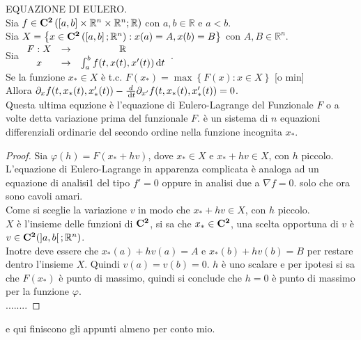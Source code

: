 \theorem EQUAZIONE DI EULERO.\\
Sia $f\in \mathbf{C^{2}}\left(\left[a,b\right]\times\mathbb{R}^n\times\mathbb{R}^n;\mathbb{R}\right)$ con $a,b\in\mathbb{R}$ e $a<b$.\\
Sia $X=\left\{x\in \mathbf{C^{2}}\left(\left[a,b\right];\mathbb{R}^n\right): x(a)=A, x(b)=B\right\}$ con $A,B\in\mathbb{R}^n$.\\
Sia $\begin{array}{ccc} F: X & \to & \mathbb{R} \\
x & \to & \int_{a}^b f(t,x(t), x'(t))\,\mathrm{d}{t}\end{array}$.\\
Se la funzione $x_\ast\in X$ è t.c. $F(x_\ast)=\max\left\{F(x):x\in X \right\}$ [o min]\\
Allora $\partial_xf(t,x_\ast(t), x_\ast'(t))-\frac{d}{\,\mathrm{d}{t}}\partial_{ x'}f(t,x_\ast(t), x_\ast'(t))=0$.\\
Questa ultima equzione è l'equazione di Eulero-Lagrange del Funzionale $F$ o a volte detta variazione prima del funzionale $F$. è un sistema di $n$ equazioni differenziali ordinarie del secondo ordine nella funzione incognita $x_\ast$.
\begin{proof}
	 Sia $\varphi(h)=F(x_\ast+hv)$, dove $x_\ast\in X$ e $x_\ast+hv\in X$, con $h$ piccolo.\\
	 L'equazione di Eulero-Lagrange in apparenza complicata è analoga ad un equazione di analisi1 del tipo $f'=0$ oppure in analisi due a $\nabla f=0$. solo che ora sono cavoli amari.\\
	 Come si sceglie la variazione $v$ in modo che $x_\ast+hv\in X$, con $h$ piccolo.\\
	 $X$ è l'insieme delle funzioni di $\mathbf{C^{2}}$, si sa che $x_\ast\in \mathbf{C^{2}}$, una scelta opportuna di $v$ è $v\in \mathbf{C^{2}}(\left]a,b\right[;\mathbb{R}^n)$.\\
	 Inotre deve essere che $ x_\ast(a)+hv(a)=A$ e  $x_\ast(b)+hv(b)=B$ per restare dentro l'insieme $X$.
	 Quindi $v(a)=v(b)=0$.
	 $h$ è uno scalare e per ipotesi si sa che $F(x_\ast)$ è punto di massimo, quindi si conclude che $h=0$ è punto di massimo per la funzione $\varphi$.\\
	 ........ 
\end{proof}
e qui finiscono gli appunti almeno per conto mio.


